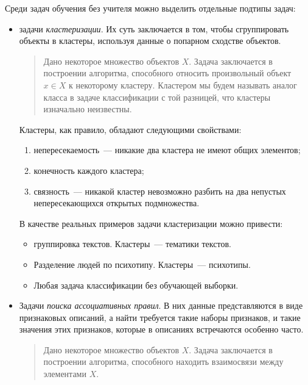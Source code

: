 Среди задач обучения без учителя можно выделить отдельные
подтипы задач:
\begin{itemize}
  \vspace*{-1ex}
  \itemsep -5pt
  \item задачи \emph{кластеризации}. Их суть заключается в том, чтобы сгруппировать объекты в кластеры,
    используя данные о попарном сходстве объектов.
    
    \begin{quote}
      \vspace*{-1ex}
      Дано некоторое множество объектов \( X \). Задача заключается в построении алгоритма, способного
      относить произвольный объект \( x\in X \) к некоторому кластеру. Кластером мы будем называть
      аналог класса в задаче классификации с той разницей, что кластеры изначально неизвестны.
      \vspace*{-1ex}
    \end{quote}
    
    Кластеры, как правило, обладают следующими свойствами:
    \begin{enumerate}
      \item непересекаемость~--- никакие два кластера не имеют общих элементов;
      \item конечность каждого кластера;
      \item связность~--- никакой кластер невозможно разбить на два непустых непересекающихся открытых
        подмножества.
    \end{enumerate}
    
    В качестве реальных примеров задачи кластеризации можно привести:
    \begin{itemize}
      \item группировка текстов. Кластеры~--- тематики текстов.
      \item Разделение людей по психотипу. Кластеры~--- психотипы.
      \item Любая задача классификации без обучающей выборки.
    \end{itemize}
    
  \item Задачи \emph{поиска ассоциативных правил}. В них данные представляются в виде признаковых
    описаний, а найти требуется такие наборы признаков, и такие значения этих признаков, которые в
    описаниях встречаются особенно часто.
    
    \begin{quote}
      \vspace*{-1ex}
      Дано некоторое множество объектов \( X \). Задача заключается в построении алгоритма, способного
      находить взаимосвязи между элементами \( X \).
      \vspace*{-1ex}
    \end{quote}
    

\end{itemize}
